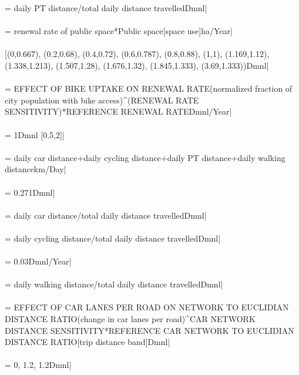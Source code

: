  = daily PT distance/total daily distance travelledDmnl| \\ \\ 
 = renewal rate of public space*Public space[space use]ha/Year| \\ \\ 
 [(0,0.667), (0.2,0.68), (0.4,0.72), (0.6,0.787), (0.8,0.88), (1,1), (1.169,1.12), (1.338,1.213), (1.507,1.28), (1.676,1.32), (1.845,1.333), (3.69,1.333))Dmnl| \\ \\ 
 = EFFECT OF BIKE UPTAKE ON RENEWAL RATE(normalized fraction of city population with bike access)\^{}(RENEWAL RATE SENSITIVITY)*REFERENCE RENEWAL RATEDmnl/Year| \\ \\ 
 = 1Dmnl [0.5,2]| \\ \\ 
 = daily car distance+daily cycling distance+daily PT distance+daily walking distancekm/Day| \\ \\ 
 = 0.271Dmnl| \\ \\ 
 = daily car distance/total daily distance travelledDmnl| \\ \\ 
 = daily cycling distance/total daily distance travelledDmnl| \\ \\ 
 = 0.03Dmnl/Year| \\ \\ 
 = daily walking distance/total daily distance travelledDmnl| \\ \\ 
 = EFFECT OF CAR LANES PER ROAD ON NETWORK TO EUCLIDIAN DISTANCE RATIO(change in car lanes per road)\^{}CAR NETWORK DISTANCE SENSITIVITY*REFERENCE CAR NETWORK TO EUCLIDIAN DISTANCE RATIO[trip distance band]Dmnl| \\ \\ 
 = 0, 1.2, 1.2Dmnl| \\ \\ 
